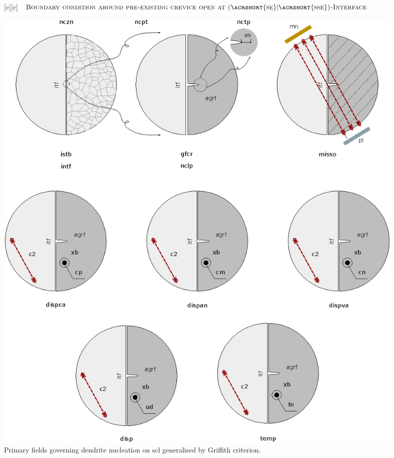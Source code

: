 \begin{figure}[htb!]
	[c]   {\scriptsize
		$\textsc{Boundary condition around pre-existing crevice
				open at (\acrshort{se}$|$\acrshort{sse})-Interface}$}

	\includegraphics[width=0.99\textwidth]{structuralfivefields_multi.eps}
	\caption{Primary fields governing dendrite nucleation on
		\acrshort{scl} generalised by Griffith criterion.
	}
	\label{\LABEL}
\end{figure}
